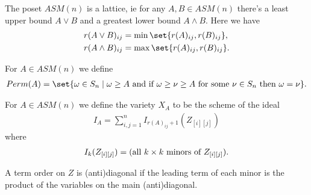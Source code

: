 \begin{example}
\begin{center}
    \end{center}
\end{example}

\begin{theorem}
    The poset $ASM(n)$ is a lattice, ie for any $A, B \in ASM(n)$ there's a least upper bound $A \lor B$ and a greatest lower bound $A \land B$. Here we have
    \begin{align*}
        r(A \lor B)_{ij} &= \min \set{ r(A)_{ij}, r(B)_{ij} },\\
        r(A \land B)_{ij} &= \max \set{ r(A)_{ij}, r(B)_{ij} }.
    \end{align*}
\end{theorem}

\begin{definition}
    For $A \in ASM(n)$ we define 
    \begin{align*}
        Perm(A) = \set{\omega \in S_n \mid \omega \geq A \text{ and if } \omega \geq \nu \geq A \text{ for some } \nu \in S_n \text{ then } \omega = \nu}.
    \end{align*}
\end{definition}

\begin{definition}
    For $A \in ASM(n)$ we define the variety $X_A$ to be the scheme of the ideal
    \begin{align*}
        I_A = \sum_{i,j = 1}^n I_{r(A)_{ij} + 1} (Z_{[i] [j]})
    \end{align*}
    where
    \begin{align*}
        I_k (Z_{[i] [j]}) = ( \text{all $ k \times k$ minors of } Z_{[i] [j]}). 
    \end{align*}
\end{definition}

\begin{definition}
    A term order on $Z$ is (anti)diagonal if the leading term of each minor is the product of the variables on the main (anti)diagonal.
\end{definition}

